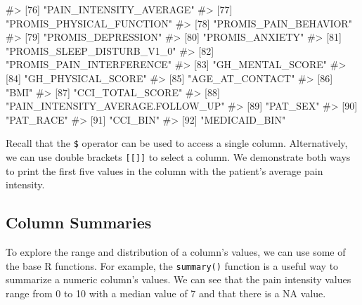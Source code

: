 \documentclass[
  letterpaper,
]{latex/krantz}
\makeatletter
\newenvironment{Shaded}{\begin{snugshade}}{\end{snugshade}}
\newcommand{\CommentTok}[1]{\textcolor[rgb]{0.37,0.37,0.37}{#1}}
\newcommand{\DecValTok}[1]{\textcolor[rgb]{0.68,0.00,0.00}{#1}}
\newcommand{\NormalTok}[1]{\textcolor[rgb]{0.00,0.23,0.31}{#1}}
\newcommand{\SpecialCharTok}[1]{\textcolor[rgb]{0.37,0.37,0.37}{#1}}
\newcommand{\StringTok}[1]{\textcolor[rgb]{0.13,0.47,0.30}{#1}}
\newenvironment{kframe}{%
\medskip{}
\setlength{\fboxsep}{.8em}
 \def\at@end@of@kframe{}%
 \ifinner\ifhmode%
  \def\at@end@of@kframe{\end{minipage}}%
  \begin{minipage}{\columnwidth}%
 \fi\fi%
 \def\FrameCommand##1{\hskip\@totalleftmargin \hskip-\fboxsep
 \colorbox{shadecolor}{##1}\hskip-\fboxsep
     \hskip-\linewidth \hskip-\@totalleftmargin \hskip\columnwidth}%
 \MakeFramed {\advance\hsize-\width
   \@totalleftmargin\z@ \linewidth\hsize
   \@setminipage}}%
 {\par\unskip\endMakeFramed%
 \at@end@of@kframe}
\renewenvironment{Shaded}{\begin{kframe}}{\end{kframe}}
\makeatother
\begin{document}
\begin{Shaded}
\begin{Highlighting}[]
\CommentTok{\#\textgreater{} [76] "PAIN\_INTENSITY\_AVERAGE"          }
\CommentTok{\#\textgreater{} [77] "PROMIS\_PHYSICAL\_FUNCTION"        }
\CommentTok{\#\textgreater{} [78] "PROMIS\_PAIN\_BEHAVIOR"            }
\CommentTok{\#\textgreater{} [79] "PROMIS\_DEPRESSION"               }
\CommentTok{\#\textgreater{} [80] "PROMIS\_ANXIETY"                  }
\CommentTok{\#\textgreater{} [81] "PROMIS\_SLEEP\_DISTURB\_V1\_0"       }
\CommentTok{\#\textgreater{} [82] "PROMIS\_PAIN\_INTERFERENCE"        }
\CommentTok{\#\textgreater{} [83] "GH\_MENTAL\_SCORE"                 }
\CommentTok{\#\textgreater{} [84] "GH\_PHYSICAL\_SCORE"               }
\CommentTok{\#\textgreater{} [85] "AGE\_AT\_CONTACT"                  }
\CommentTok{\#\textgreater{} [86] "BMI"                             }
\CommentTok{\#\textgreater{} [87] "CCI\_TOTAL\_SCORE"                 }
\CommentTok{\#\textgreater{} [88] "PAIN\_INTENSITY\_AVERAGE.FOLLOW\_UP"}
\CommentTok{\#\textgreater{} [89] "PAT\_SEX"                         }
\CommentTok{\#\textgreater{} [90] "PAT\_RACE"                        }
\CommentTok{\#\textgreater{} [91] "CCI\_BIN"                         }
\CommentTok{\#\textgreater{} [92] "MEDICAID\_BIN"}
\end{Highlighting}
\end{Shaded}

Recall that the \texttt{\$} operator can be used to access a single
column. Alternatively, we can use double brackets \texttt{{[}{[}{]}{]}}
to select a column. We demonstrate both ways to print the first five
values in the column with the patient's average pain intensity.

\begin{Shaded}
\end{Shaded}

\subsection{\texorpdfstring{Column Summaries
}{Column Summaries }}\label{column-summaries}

To explore the range and distribution of a column's values, we can use
some of the base R functions. For example, the
\texttt{summary()}
function is a useful way to summarize a numeric column's values. We can
see that the pain intensity values range from 0 to 10 with a median
value of 7 and that there is a NA value.
\end{document}
